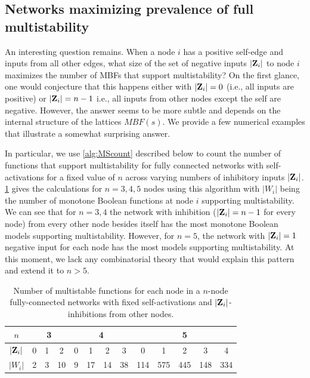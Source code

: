 \documentclass[12pt]{amsart}
\newcommand{\bZ}{{\bf Z}}
\theoremstyle{definition}
\begin{document}
\subsection{Networks maximizing prevalence of full multistability}

An interesting question remains. When a node $i$ has a positive self-edge and inputs from all other edges, what size of the set of negative inputs $|\bZ_i|$ to node $i$ maximizes the number of MBFs that support multistability? On the first glance, one would conjecture that this happens either with $|\bZ_i|=0$ (i.e., all inputs are positive) or $|\bZ_i|=n-1$ i.e., all inputs from other nodes except the self are negative. However, the answer seems to be more subtle and depends on the internal structure of the lattices $MBF(s)$. We provide a few numerical examples that illustrate a somewhat surprising answer. 

In particular, we use \cref{alg:MScount} described below to count the number of functions that support multistability for fully connected networks with self-activations for a fixed value of $n$ across varying numbers of inhibitory inputs $|\bZ_i|$. \cref{tab:MSnfuncs} gives the calculations for $n=3,4,5$ nodes using this algorithm with $|W_i|$ being the number of monotone Boolean functions at node $i$ supporting multistability.
We can see that for $n=3,4$ the network with inhibition ($|\bZ_i|=n-1$ for every node) from every other node besides itself has the most monotone Boolean models supporting multistability. However, for $n=5$, the network with $|\bZ_i|=1$ negative input for each node has the most models supporting multistability. At this moment, we lack any combinatorial theory that would explain this pattern and extend it to $n>5.$

\begin{table}[h]
    \centering
    \begin{tabular}{|c|c|c|c|c|c|c|c|c|c|c|c|c|}
        \hline
        $n$ & \multicolumn{3}{c|}{3} & \multicolumn{4}{c|}{4} &\multicolumn{5}{c|}{5} \\
        \hline
        $|\bZ_i|$ & 0 & 1 & 2 & 0 & 1 & 2 & 3 & 0 & 1 & 2 & 3 & 4 \\
        $|W_i|$ & 2 & 3 & 10 & 9 & 17 & 14 & 38 & 114 & 575 & 445 & 148 & 334 \\
        \hline
    \end{tabular}
    \caption{Number of multistable functions for each node in a $n$-node fully-connected networks with fixed self-activations and $|\bZ_i|$-inhibitions from other nodes.}
    \label{tab:MSnfuncs}
\end{table}
\end{document}
